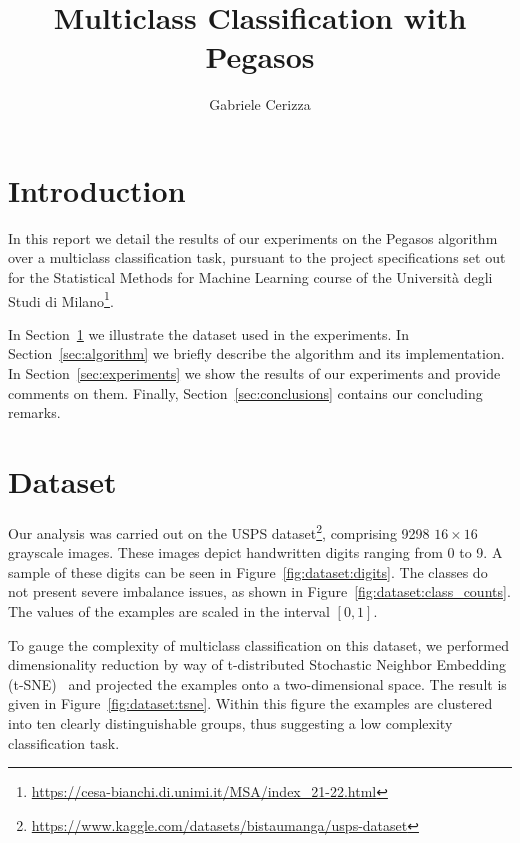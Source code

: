 \documentclass[runningheads]{llncs}
\begin{document}
\title{
    Multiclass Classification with Pegasos
}
\author{Gabriele Cerizza}


\maketitle

\section*{Introduction}
\label{sec:introduction}

In this report we detail the results of our experiments on the Pegasos algorithm~\cite{shalev-pegasos-2011} over a multiclass classification task, pursuant to the project specifications set out for the Statistical Methods for Machine Learning course of the Università degli Studi di Milano\footnote{\url{https://cesa-bianchi.di.unimi.it/MSA/index\_21-22.html}}. 

In Section~\ref{sec:dataset} we illustrate the dataset used in the experiments. In Section~\ref{sec:algorithm} we briefly describe the algorithm and its implementation. In Section~\ref{sec:experiments} we show the results of our experiments and provide comments on them. Finally, Section~\ref{sec:conclusions} contains our concluding remarks. 

\section{Dataset}
\label{sec:dataset}

Our analysis was carried out on the USPS dataset\footnote{\url{https://www.kaggle.com/datasets/bistaumanga/usps-dataset}}, comprising 9298 $16\times16$ grayscale images. These images depict handwritten digits ranging from 0 to 9. A sample of these digits can be seen in Figure~\ref{fig:dataset:digits}. The classes do not present severe imbalance issues, as shown in Figure~\ref{fig:dataset:class_counts}. The values of the examples are scaled in the interval $[0, 1]$.

To gauge the complexity of multiclass classification on this dataset, we performed dimensionality reduction by way of  t-distributed Stochastic Neighbor Embedding (t-SNE)~\cite{maaten-2008-tsne} and projected the examples onto a two-dimensional space. The result is given in Figure~\ref{fig:dataset:tsne}. Within this figure the examples are clustered into ten clearly distinguishable groups, thus suggesting a low complexity classification task.   
\end{document}
